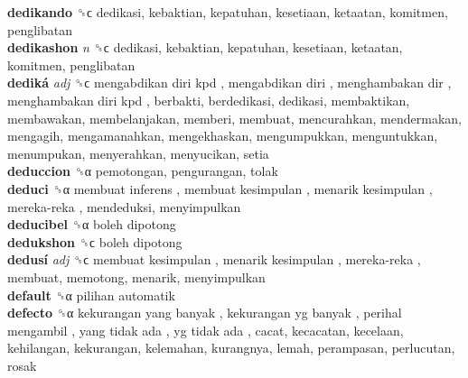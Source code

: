 \textbf{dedikando} ␝ϲ  dedikasi, kebaktian, kepatuhan, kesetiaan, ketaatan, komitmen, penglibatan  \\
\textbf{dedikashon} \emph{n}  ␝ϲ  dedikasi, kebaktian, kepatuhan, kesetiaan, ketaatan, komitmen, penglibatan  \\
\textbf{dediká} \emph{adj}  ␝ϲ   mengabdikan diri kpd ,  mengabdikan diri ,  menghambakan dir ,  menghambakan diri kpd , berbakti, berdedikasi, dedikasi, membaktikan, membawakan, membelanjakan, memberi, membuat, mencurahkan, mendermakan, mengagih, mengamanahkan, mengekhaskan, mengumpukkan, menguntukkan, menumpukan, menyerahkan, menyucikan, setia  \\
\textbf{deduccion} ␝α  pemotongan, pengurangan, tolak  \\
\textbf{deduci} ␝α   membuat inferens ,  membuat kesimpulan ,  menarik kesimpulan ,  mereka-reka , mendeduksi, menyimpulkan  \\
\textbf{deducibel} ␝α   boleh dipotong   \\
\textbf{dedukshon} ␝ϲ   boleh dipotong   \\
\textbf{dedusí} \emph{adj}  ␝ϲ   membuat kesimpulan ,  menarik kesimpulan ,  mereka-reka , membuat, memotong, menarik, menyimpulkan  \\
\textbf{default} ␝α   pilihan automatik   \\
\textbf{defecto} ␝α   kekurangan yang banyak ,  kekurangan yg banyak ,  perihal mengambil ,  yang tidak ada ,  yg tidak ada , cacat, kecacatan, kecelaan, kehilangan, kekurangan, kelemahan, kurangnya, lemah, perampasan, perlucutan, rosak  \\
